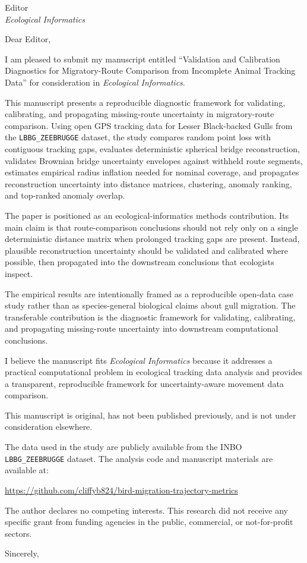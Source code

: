\documentclass[11pt]{letter}
\begin{document}
\begin{letter}{Editor\\ \emph{Ecological Informatics}}

\opening{Dear Editor,}

I am pleased to submit my manuscript entitled ``Validation and Calibration Diagnostics for Migratory-Route Comparison from Incomplete Animal Tracking Data'' for consideration in \emph{Ecological Informatics}.

This manuscript presents a reproducible diagnostic framework for validating, calibrating, and propagating missing-route uncertainty in migratory-route comparison. Using open GPS tracking data for Lesser Black-backed Gulls from the \texttt{LBBG\_ZEEBRUGGE} dataset, the study compares random point loss with contiguous tracking gaps, evaluates deterministic spherical bridge reconstruction, validates Brownian bridge uncertainty envelopes against withheld route segments, estimates empirical radius inflation needed for nominal coverage, and propagates reconstruction uncertainty into distance matrices, clustering, anomaly ranking, and top-ranked anomaly overlap.

The paper is positioned as an ecological-informatics methods contribution. Its main claim is that route-comparison conclusions should not rely only on a single deterministic distance matrix when prolonged tracking gaps are present. Instead, plausible reconstruction uncertainty should be validated and calibrated where possible, then propagated into the downstream conclusions that ecologists inspect.

The empirical results are intentionally framed as a reproducible open-data case study rather than as species-general biological claims about gull migration. The transferable contribution is the diagnostic framework for validating, calibrating, and propagating missing-route uncertainty into downstream computational conclusions.

I believe the manuscript fits \emph{Ecological Informatics} because it addresses a practical computational problem in ecological tracking data analysis and provides a transparent, reproducible framework for uncertainty-aware movement data comparison.

This manuscript is original, has not been published previously, and is not under consideration elsewhere.

The data used in the study are publicly available from the INBO \texttt{LBBG\_ZEEBRUGGE} dataset. The analysis code and manuscript materials are available at:

\url{https://github.com/cliffyb824/bird-migration-trajectory-metrics}

The author declares no competing interests. This research did not receive any specific grant from funding agencies in the public, commercial, or not-for-profit sectors.

\closing{Sincerely,}

\end{letter}
\end{document}
